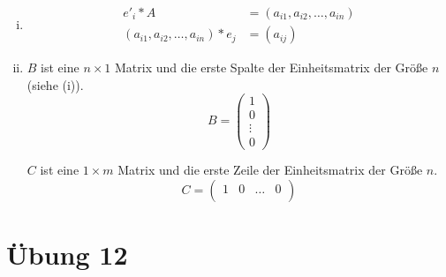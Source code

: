 \documentclass{article}
\begin{document}
\begin{enumerate}[(i)]
\item
  \begin{align*}
    e'_i * A                                            &= \left( a_{i1}, a_{i2}, \ldots, a_{in} \right) \\
    \left( a_{i1}, a_{i2}, \ldots, a_{in} \right) * e_j &= \left( a_{ij} \right)
  \end{align*}

\item
  $B$ ist eine $n \times 1$ Matrix und die erste Spalte der Einheitsmatrix der Größe $n$ (siehe (i)).
  \[
    B = \left(
      \begin{array}{c}
        1 \\
        0 \\
        \vdots \\
        0
      \end{array}
    \right)
  \]

  $C$ ist eine $1 \times m$ Matrix und die erste Zeile der Einheitsmatrix der Größe $n$.
  \[
    C = \left(
      \begin{array}{cccc}
        1 & 0 & \ldots & 0 \\
      \end{array}
    \right)
  \]
\end{enumerate}

\newpage
\section*{Übung 12}
\end{document}

